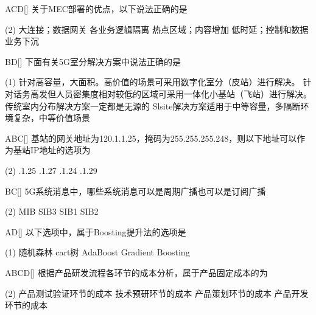 \begin{choice}{\;ACD\;}[]
	关于MEC部署的优点，以下说法正确的是
	\begin{tasks}(2)
		\task 大连接；数据网关
		\task 各业务逻辑隔离
		\task 热点区域；内容增加
		\task 低时延；控制和数据业务下沉
	\end{tasks}
\end{choice}

\begin{choice}{\;BD\;}[]
	下面有关5G室分解决方案中说法正确的是
	\begin{tasks}(1)
		\task 针对高容量，大面积。高价值的场景可采用数字化室分（皮站）进行解决。
		\task 针对话务高发但人员密集度相对较低的区域可采用一体化小基站（飞站）进行解决。
		\task 传统室内分布解决方案一定都是无源的
		\task Slsite解决方案适用于中等容量，多隔断环境复杂，中等价值场景
	\end{tasks}
\end{choice}


\begin{choice}{\;ABC\;}[]
	基站的网关地址为120.1.1.25，掩码为255.255.255.248，则以下地址可以作为基站IP地址的选项为
	\begin{tasks}(2)
		.1.25
		.1.27
		.1.24	
		.1.29
	\end{tasks}
\end{choice}


\begin{choice}{\;BC\;}[]
	5G系统消息中，哪些系统消息可以是周期广播也可以是订阅广播
	\begin{tasks}(2)
		\task MIB
		\task SIB3
		\task SIB1
		\task SIB2
	\end{tasks}
\end{choice}


\begin{choice}{\;AD\;}[]
	以下选项中，属于Boosting提升法的选项是
	\begin{tasks}(1)
		\task 随机森林
		\task cart树
		\task AdaBoost
		\task Gradient Boosting
	\end{tasks}
\end{choice}


\begin{choice}{\;ABCD\;}[]
	根据产品研发流程各环节的成本分析，属于产品固定成本的为
	\begin{tasks}(2)
		\task 产品测试验证环节的成本
		\task 技术预研环节的成本
		\task 产品策划环节的成本
		\task 产品开发环节的成本
	\end{tasks}
\end{choice}

